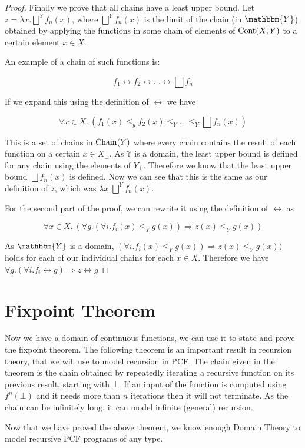 \begin{proof}
Finally we prove that all chains have a least upper bound. Let $z = \lambda x. \bigsqcup^Y f_n (x)$, where $\bigsqcup^Y f_n (x)$ is the limit of the chain (in $\mathbbm{Y}$) obtained by applying the functions in some chain of elements of $\operatorname{Cont}(X,Y)$ to a certain element $x \in X$.

An example of a chain of such functions is:

\[ f_1 \rel f_2 \rel \dots \rel \bigsqcup f_n \]

If we expand this using the definition of $\rel$ we have

\[ \forall x \in X. \ (f_1(x) \leq_y f_2(x) \leq_Y \dots \leq_Y \bigsqcup f_n (x)) \]

This is a set of chains in $\operatorname{Chain}(Y)$ where every chain contains the result of each function on a certain $x \in X_\bot$. As $\mathbb{Y}$ is a domain, the least upper bound is defined for any chain using the elements of $Y_\bot$. Therefore we know that the least upper bound $\bigsqcup f_n (x)$ is defined. Now we can see that this is the same as our definition of $z$, which was $\lambda x. \bigsqcup^Y f_n (x)$.

For the second part of the proof, we can rewrite it using the definition of $\rel$ as

\[ \forall x \in X. \ (\forall g. (\forall i . f_i(x) \leq_Y g(x)) \Rightarrow z(x) \leq_Y g(x)) \]


As $\mathbbm{Y}$ is  a domain, $(\forall i . f_i(x) \leq_Y g(x)) \Rightarrow z(x) \leq_Y g(x))$ holds for each of our individual chains for each $x \in X$. Therefore we have $ \forall g. (\forall i . f_i \rel g) \Rightarrow z \rel g$
\end{proof}


\section{Fixpoint Theorem}\label{fixpoint}

Now we have a domain of continuous functions, we can use it to state and prove the fixpoint theorem. The following theorem is an important result in recursion theory, that we will use to model recursion in PCF. The chain given in the theorem is the chain obtained by repeatedly iterating a recursive function on its previous result, starting with $\bot$. If an input of the function is computed using $f^n(\bot)$ and it needs more than $n$ iterations then it will not terminate. As the chain can be infinitely long, it can model infinite (general) recursion.

\vspace{0.5cm}



Now that we have proved the above theorem, we know enough Domain Theory to model recursive PCF programs of any type.